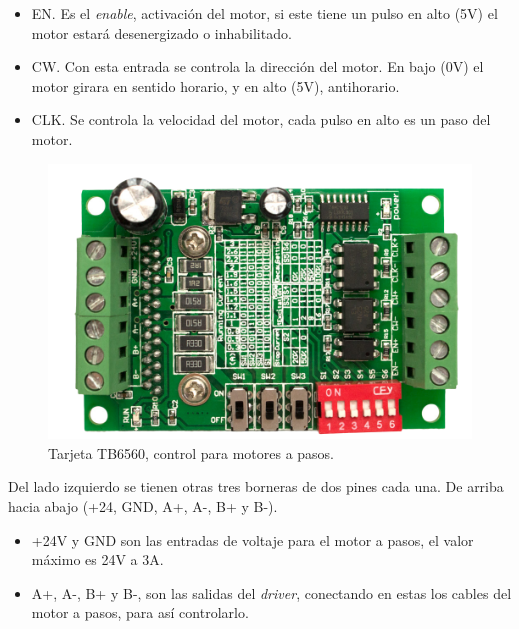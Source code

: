 \begin{itemize}
	\item EN. Es el \textit{enable}, activación del motor, si este tiene un pulso en alto (5V) el motor estará desenergizado o inhabilitado.
	\item CW. Con esta entrada se controla la dirección del motor. En bajo (0V) el motor girara en sentido horario, y en alto (5V), antihorario.
	\item CLK. Se controla la velocidad del motor, cada pulso en alto es un paso del motor.
\end{itemize}

\begin{figure}[h]
	\centering
	\includegraphics[width=0.7\linewidth]{Imagenes/2/TB6560a}
	\caption{Tarjeta TB6560, control para motores a pasos. \cite{TB6560}}
	\label{fig:tb6560}
\end{figure}
Del lado izquierdo se tienen otras tres borneras de dos pines cada una. De arriba hacia abajo (+24, GND, A+, A-, B+ y B-). 
\begin{itemize}
	\item +24V y GND son las entradas de voltaje para el motor a pasos, el valor máximo es 24V a 3A. 
	\item A+, A-, B+ y B-, son las salidas del \textit{driver}, conectando en estas los cables del motor a pasos, para así controlarlo.
\end{itemize} 

